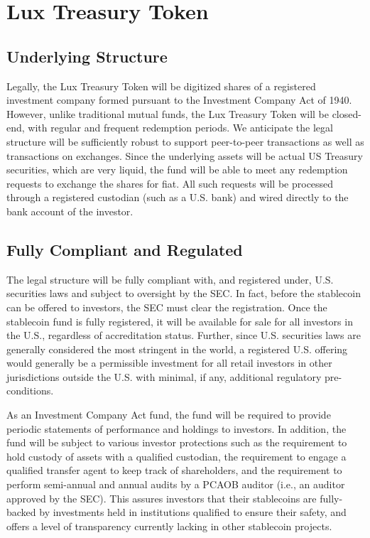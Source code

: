 \documentclass[11pt]{article}
\begin{document}
\section{Lux Treasury Token}

\subsection{Underlying Structure}

Legally, the Lux Treasury Token will be digitized shares of a registered investment company formed pursuant to the Investment Company Act of 1940.  However, unlike traditional mutual funds, the Lux Treasury Token will be closed-end, with regular and frequent redemption periods.  We anticipate the legal structure will be sufficiently robust to support peer-to-peer transactions as well as transactions on exchanges.  Since the underlying assets will be actual US Treasury securities, which are very liquid, the fund will be able to meet any redemption requests to exchange the shares for fiat.  All such requests will be processed through a registered custodian (such as a U.S. bank) and wired directly to the bank account of the investor.


\subsection{Fully Compliant and Regulated}

The legal structure will be fully compliant with, and registered under, U.S. securities laws and subject to oversight by the SEC.  In fact, before the stablecoin can be offered to investors, the SEC must clear the registration.  Once the stablecoin fund is fully registered, it will be available for sale for all investors in the U.S., regardless of accreditation status.  Further, since U.S. securities laws are generally considered the most stringent in the world, a registered U.S. offering would generally be a permissible investment for all retail investors in other jurisdictions outside the U.S. with minimal, if any, additional regulatory pre-conditions.


As an Investment Company Act fund, the fund will be required to provide periodic statements of performance and holdings to investors.  In addition, the fund will be subject to various investor protections such as the requirement to hold custody of assets with a qualified custodian, the requirement to engage a qualified transfer agent to keep track of shareholders, and the requirement to perform semi-annual and annual audits by a PCAOB auditor (i.e., an auditor approved by the SEC).  This assures investors that their stablecoins are fully-backed by investments held in institutions qualified to ensure their safety, and offers a level of transparency currently lacking in other stablecoin projects.
\end{document}
